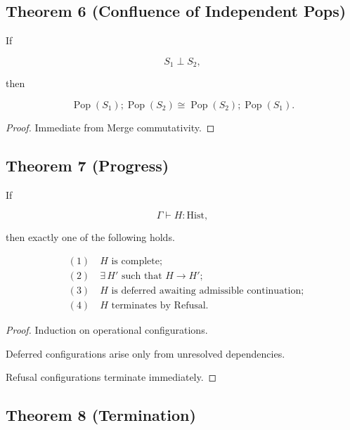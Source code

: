 \documentclass[12pt,oneside]{article}
\theoremstyle{definition}
\theoremstyle{remark}
\begin{document}
\subsection*{Theorem 6 (Confluence of Independent Pops)}

If

\[
S_1
\perp
S_2,
\]

then

\[
\operatorname{Pop}(S_1)
;
\operatorname{Pop}(S_2)
\cong
\operatorname{Pop}(S_2)
;
\operatorname{Pop}(S_1).
\]

\begin{proof}

Immediate from Merge commutativity.

\end{proof}

\subsection*{Theorem 7 (Progress)}

If

\[
\Gamma
\vdash
H:\mathrm{Hist},
\]

then exactly one of the following holds.

\[
\begin{aligned}
&(1)\quad H\text{ is complete};\\
&(2)\quad \exists\,H'
\text{ such that }
H\rightarrow H';\\
&(3)\quad H
\text{ is deferred awaiting admissible continuation};\\
&(4)\quad H
\text{ terminates by Refusal.}
\end{aligned}
\]

\begin{proof}

Induction on operational configurations.

Deferred configurations arise only from unresolved dependencies.

Refusal configurations terminate immediately.

\end{proof}

\subsection*{Theorem 8 (Termination)}
\end{document}
